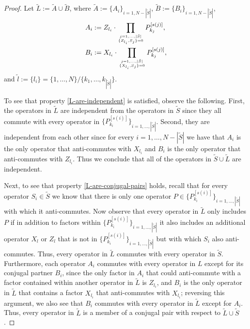 \documentclass[twocolumn,showpacs,preprintnumbers,amsmath,amssymb,nofootinbib,pra,floatfix]{revtex4}
\newcommand{\set}{\tilde}
\begin{document}
\begin{proof}
Let $\set L:=\set A\cup\set B$, where $\set A:=\{A_i\}_{i=1,N-|\set S|}$, $\set B:=\{B_i\}_{i=1,N-|\set S|}$,
$$
\begin{aligned}
A_i &:= Z_{l_i}\cdot \prod_{j=1,\dots,|\set S|\atop \{Z_{l_i},S_j\}=0} P_{k_j}^{[s(j)]},\\
B_i &:= X_{l_i}\cdot \prod_{j=1,\dots,|\set S|\atop \{X_{l_i},S_j\}=0} P_{k_j}^{[s(j)]},\\
\end{aligned}
$$ and $\set l:=\{l_i\}=\{1,\dots,N\}\slash\{k_1,\dots,k_{|\set S|}\}$.

To see that property \ref{L-are-independent} is satisfied, observe the following.  First, the operators in $\set L$ are independent from the operators in $\set S$ since they all commute with every operator in $\{P_{k_i}^[s(i)]\}_{i=1,\dots,|\set S|}$.  Second, they are independent from each other since for every $i=1,\dots,N-|\set S|$ we have that $A_i$ is the only operator that anti-commutes with $X_{l_i}$ and $B_i$ is the only operator that anti-commutes with $Z_{l_i}$.  Thus we conclude that all of the operators in $\set S\cup\set L$ are independent.

Next, to see that property \ref{L-are-conjugal-pairs} holds, recall that for every operator $S_i\in\set S$ we know that there is only one operator $P\in\{P_{k_i}^[s(i)]\}_{i=1,\dots,|\set S|}$ with which it anti-commutes.  Now observe that every operator in $\set L$ only includes $P$ if in addition to factors within $\{P_{k_i}^[s(i)]\}_{i=1,\dots,|\set S|}$ it also includes an additional operator $X_l$ or $Z_l$ that is not in $\{P_{k_i}^[s(i)]\}_{i=1,\dots,|\set S|}$ but with which $S_i$ also anti-commutes.  Thus, every operator in $\set L$ commutes with every operator in $\set S$.  Furthermore, each operator $A_i$ commutes with every operator in $L$ except for its conjugal partner $B_i$, since the only factor in $A_i$ that could anti-commute with a factor contained within another operator in $\set L$ is $Z_{l_i}$, and $B_i$ is the only operator in $\set L$ that contains a factor $X_{l_i}$ that anti-commutes with $X_{l_i}$;  reversing this argument, we also see that $B_i$ commutes with every operator in $\set L$ except for $A_i$.  Thus, every operator in $\set L$ is a member of a conjugal pair with respect to $\set L\cup\set S$.


\end{proof}
\end{document}
